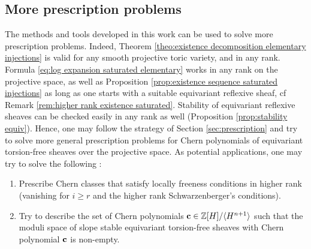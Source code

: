 \documentclass[a4paper,10pt]{amsart}
\theoremstyle{plain}{
    \newtheorem{theorem}{Theorem}[section]
    \newtheorem{lemma}[theorem]{Lemma}
    \newtheorem{corollary}[theorem]{Corollary}
    \newtheorem{proposition}[theorem]{Proposition}
    \newtheorem{conjecture}[theorem]{Conjecture}
}
\theoremstyle{definition}{
    \newtheorem{definition}[theorem]{Definition}
    \newtheorem{defn-thm}[theorem]{Definition-Theorem}
    \newtheorem{example}[theorem]{Example}
    \newtheorem{notation}[theorem]{Notation}
}
\theoremstyle{remark}{
    \newtheorem{remark}[theorem]{Remark}
    \newtheorem{problem}[theorem]{Problem}
    \newtheorem{question}[theorem]{Question}
}
\def\uc{{\bf c}}
\def\Z{\mathbb{Z}}
\begin{document}
\subsection{More prescription problems}
\label{sec:more prescriptions}
The methods and tools developed in this work can be used to solve more prescription problems. Indeed, Theorem \ref{theo:existence decomposition elementary injections} is valid for any smooth projective toric variety, and in any rank. Formula \ref{eq:log expansion saturated elementary} works in any rank on the projective space, as well as Proposition \ref{prop:existence sequence saturated injections} as long as one starts with a suitable equivariant reflexive sheaf, cf Remark \ref{rem:higher rank existence saturated}. Stability of equivariant reflexive sheaves can be checked easily in any rank as well (Proposition \ref{prop:stability equiv}). Hence, one may follow
the strategy of Section \ref{sec:prescription} and try to solve more general prescription problems for Chern polynomials of equivariant torsion-free sheaves over the projective space. As potential applications, one may try to solve the following :
\begin{enumerate}
 \item Prescribe Chern classes that satisfy locally freeness conditions in higher rank (vanishing for $i\geq r$ and the higher rank Schwarzenberger's conditions).
 \item Try to describe the set of Chern polynomials $\uc\in\Z[H]/\langle H^{n+1}\rangle$ such that the moduli space of slope stable equivariant torsion-free sheaves with Chern polynomial $\uc$ is non-empty.
\end{enumerate}

 


\end{document}
